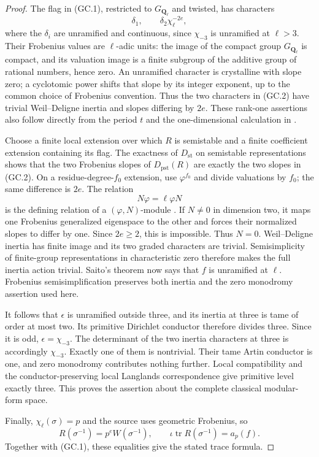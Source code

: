 \documentclass[11pt,a4paper]{article}
\theoremstyle{definition}
\begin{document}
\begin{proof}
The flag in (GC.1), restricted to $G_{\mathbf Q_\ell}$ and twisted,
has characters
\[
       \delta_1,\qquad \delta_2\chi_\ell^{-2e},
 \tag{GC.2}
\]
where the $\delta_i$ are unramified and continuous, since
$\chi_{-3}$ is unramified at $\ell>3$.
Their Frobenius values are $\ell$-adic units: the image of the compact
group $G_{\mathbf Q_\ell}$ is compact, and its valuation image is a
finite subgroup of the additive group of rational numbers, hence zero.
An unramified character is crystalline with slope zero; a cyclotomic
power shifts that slope by its integer exponent, up to the common
choice of Frobenius convention. Thus the two characters in (GC.2)
have trivial Weil--Deligne inertia and slopes differing by $2e$.
These rank-one assertions also follow directly from the period $t$
and the one-dimensional calculation in
\cite[\S4.2, Proposition~4.4 and its proof, p.~24]{K17ColmezFontaine2000}.

Choose a finite local extension over which $R$ is semistable and a
finite coefficient extension containing its flag. The exactness of
$D_{\mathrm{st}}$ on semistable representations
\cite[\S4.1, Proposition~4.2, p.~23]{K17ColmezFontaine2000}
shows that the two Frobenius slopes of $D_{\mathrm{pst}}(R)$ are exactly
the two slopes in (GC.2). On a residue-degree-$f_0$ extension, use
$\varphi^{f_0}$ and divide valuations by $f_0$; the same difference is
$2e$. The relation
\[
                  N\varphi=\ell\varphi N
\]
is the defining relation of a $(\varphi,N)$-module
\cite[\S3.3, p.~21]{K17ColmezFontaine2000}.
If $N\ne0$ in dimension two, it maps one Frobenius generalized
eigenspace to the other and forces their normalized slopes to differ
by one. Since $2e\ge2$, this is impossible. Thus $N=0$.
Weil--Deligne inertia has finite image and its two graded characters
are trivial. Semisimplicity of finite-group representations in
characteristic zero therefore makes the full inertia action trivial.
Saito's theorem now says that $f$ is unramified at $\ell$.
Frobenius semisimplification preserves both inertia and the zero
monodromy assertion used here.

It follows that $\epsilon$ is unramified outside three, and its inertia
at three is tame of order at most two. Its primitive Dirichlet conductor
therefore divides three. Since it is odd, $\epsilon=\chi_{-3}$.
The determinant of the two inertia characters at three is accordingly
$\chi_{-3}$. Exactly one of them is nontrivial. Their tame Artin
conductor is one, and zero monodromy contributes nothing further.
Local compatibility and the conductor-preserving local Langlands
correspondence give primitive level exactly three. This proves the
assertion about the complete classical modular-form space.

Finally, $\chi_\ell(\sigma)=p$ and the source uses geometric Frobenius,
so
\[
 R(\sigma^{-1})=p^eW(\sigma^{-1}),\qquad
 \iota\operatorname{tr}R(\sigma^{-1})=a_p(f).
\]
Together with (GC.1), these equalities give the stated trace formula.
\end{proof}
\end{document}
